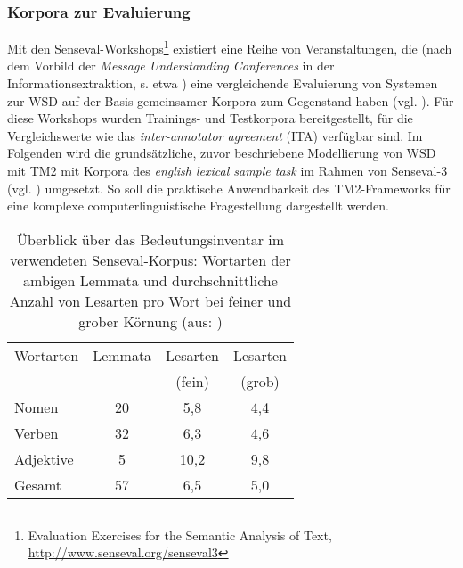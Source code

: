 \documentclass[abstracton, 12pt]{scrartcl}
\begin{document}
\subsubsection{Korpora zur Evaluierung} \label{senseval-workshops}  

Mit den Senseval-Workshops\footnote{Evaluation Exercises for the Semantic Analysis of Text, \url{http://www.senseval.org/senseval3}} existiert eine Reihe von Veranstaltungen, die (nach dem Vorbild der \emph{Message Understanding Conferences} in der Informationsextraktion, s. etwa \citealt{GrishmanAndSundheim1996}) eine vergleichende Evaluierung von Systemen zur WSD auf der Basis gemeinsamer Korpora zum Gegenstand haben (vgl. \citealt[86]{PalmerEtAl2006}). Für diese Workshops wurden Trainings- und Testkorpora bereitgestellt, für die Vergleichswerte wie das \emph{inter-annotator agreement} (ITA) verfügbar sind. Im Folgenden wird die grundsätzliche, zuvor beschriebene Modellierung von WSD mit TM2 mit Korpora des \emph{english lexical sample task} im Rahmen von Senseval-3 (vgl. \citealt{MihalceaEtAl2004}) umgesetzt. So soll die praktische Anwendbarkeit des TM2-Frameworks für eine komplexe computerlinguistische Fragestellung dargestellt werden.

\begin{table}
\begin{center}\begin{tabular}{l|c|c|c}
Wortarten & Lemmata & Lesarten & Lesarten \\
& & (fein) & (grob)\\\hline
Nomen & 20 & 5,8 & 4,4 \\
Verben & 32 & 6,3 & 4,6 \\
Adjektive & 5 & 10,2 & 9,8 \\\hline
Gesamt & 57 & 6,5 & 5,0\end{tabular} \caption[Überblick über das Bedeutungsinventar]{Überblick über das Bedeutungsinventar im verwendeten Senseval-Korpus: Wortarten der ambigen Lemmata und durchschnittliche Anzahl von Lesarten pro Wort bei feiner und grober Körnung (aus: \citealt{MihalceaEtAl2004})}\label{inventar}
\end{center}
\label{defaulttable}
\end{table}
\end{document}

